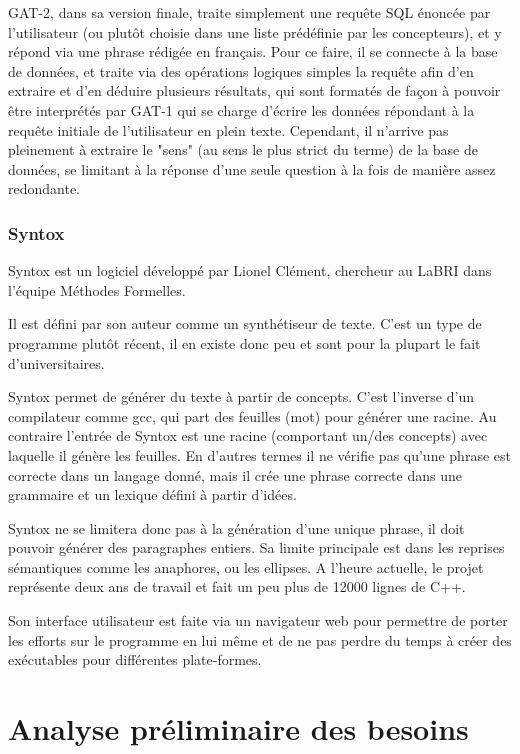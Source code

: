 \documentclass[12pt]{report}
\begin{document}
GAT-2, dans sa version finale, traite simplement une requête SQL énoncée par l'utilisateur (ou plutôt choisie dans une liste prédéfinie par les concepteurs), et y répond via une phrase rédigée en français. Pour ce faire, il se connecte à la base de données, et traite via des opérations logiques simples la requête afin d'en extraire et d'en déduire plusieurs résultats, qui sont formatés de façon à pouvoir être interprétés par GAT-1 qui se charge d'écrire les données répondant à la requête initiale de l'utilisateur en plein texte.
Cependant, il n'arrive pas pleinement à extraire le "sens" (au sens le plus strict du terme) de la base de données, se limitant à la réponse d'une seule question à la fois de manière assez redondante.

\subsection{Syntox}

Syntox \cite{Clem12} est un logiciel développé par Lionel Clément, chercheur au LaBRI dans l'équipe Méthodes Formelles.

Il est défini par son auteur comme un synthétiseur de texte. C'est un type de programme plutôt récent, il en existe donc peu et sont pour la plupart le fait d'universitaires.

Syntox permet de générer du texte à partir de concepts. C'est l'inverse d'un compilateur comme gcc, qui part des feuilles (mot) pour générer une racine. Au contraire l'entrée de Syntox est une racine (comportant un/des concepts) avec laquelle il génère les feuilles. En d'autres termes il ne vérifie pas qu'une phrase est correcte dans un langage donné, mais il crée une phrase correcte dans une grammaire et un lexique défini à partir d'idées.

Syntox ne se limitera donc pas à la génération d'une unique phrase, il doit pouvoir générer des paragraphes entiers. Sa limite principale est dans les reprises sémantiques comme les anaphores, ou les ellipses.
A l'heure actuelle, le projet représente deux ans de travail et fait un peu plus de 12000 lignes de C++.

Son interface utilisateur est faite via un navigateur web pour permettre de porter les efforts sur le programme en lui même et de ne pas perdre du temps à créer des exécutables pour différentes plate-formes. 


\chapter{Analyse préliminaire des besoins}
\end{document}
